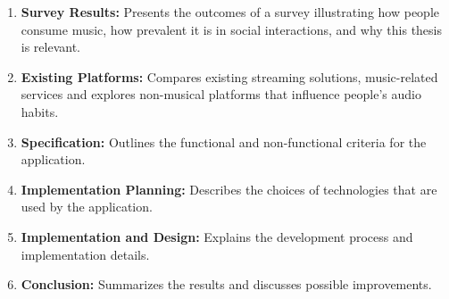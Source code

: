 \begin{enumerate}
    \item \textbf{Survey Results:}
    Presents the outcomes of a survey illustrating how people consume music,
    how prevalent it is in social interactions, and why this thesis is relevant.

    \item \textbf{Existing Platforms:}
    Compares existing streaming solutions, music-related services
    and explores non-musical platforms that influence people’s audio habits.

    \item \textbf{Specification:}
    Outlines the functional and non-functional criteria for the application.

    \item \textbf{Implementation Planning:}
    Describes the choices of technologies that are used by the application.

    \item \textbf{Implementation and Design:}
    Explains the development process and implementation details.

    \item \textbf{Conclusion:}
    Summarizes the results and discusses possible improvements.
\end{enumerate}